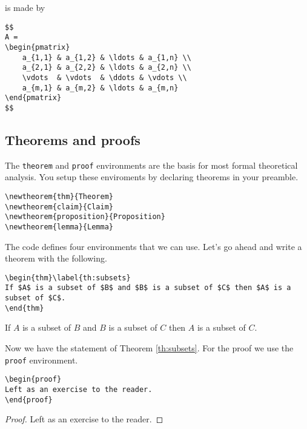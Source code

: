 is made by

\begin{lstlisting}
$$
A =
\begin{pmatrix}
	a_{1,1}	& a_{1,2} & \ldots & a_{1,n} \\
	a_{2,1} & a_{2,2} & \ldots & a_{2,n} \\
	\vdots 	& \vdots  & \ddots & \vdots \\
	a_{m,1} & a_{m,2} & \ldots & a_{m,n} 
\end{pmatrix}
$$
\end{lstlisting}

\subsection{Theorems and proofs}

The \texttt{theorem} and \texttt{proof} environments are the basis for most formal theoretical analysis. You setup these enviroments by declaring theorems in your preamble. 

\begin{lstlisting}
\newtheorem{thm}{Theorem}
\newtheorem{claim}{Claim}
\newtheorem{proposition}{Proposition}
\newtheorem{lemma}{Lemma}
\end{lstlisting}

The code defines four environments that we can use. Let's go ahead and write a theorem with the following.

\begin{lstlisting}
\begin{thm}\label{th:subsets}
If $A$ is a subset of $B$ and $B$ is a subset of $C$ then $A$ is a subset of $C$.
\end{thm}
\end{lstlisting}

\begin{thm}\label{th:subsets}
If $A$ is a subset of $B$ and $B$ is a subset of $C$ then $A$ is a subset
of $C$.
\end{thm}

Now we have the statement of Theorem \ref{th:subsets}. For the proof we use the \texttt{proof} environment.

\begin{lstlisting}
\begin{proof}
Left as an exercise to the reader.
\end{proof}
\end{lstlisting}

\begin{proof}
Left as an exercise to the reader.
\end{proof}

